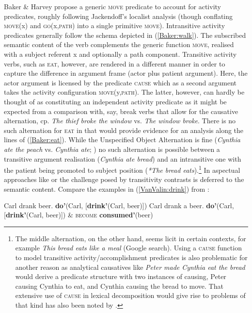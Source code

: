 Baker \& Harvey propose a generic \textsc{move} predicate to account for activity predicates, roughly following Jackendoff's  localist analysis (though conflating \textsc{move}(x) and \textsc{go}(x,\textsc{path}) into a single primitive \textsc{move}). Intransitive activity predicates generally follow the schema depicted in (\ref{Baker:walk}). The subscribed semantic content of the verb complements the generic function \textsc{move}, realised with a subject referent x and optionally a path component. Transitive activity verbs, such as \textsc{eat}, however, are rendered in a different manner in order to capture the difference in argument frame (actor plus patient argument). Here, the actor argument is licensed by the predicate \textsc{cause} which as a second argument takes the activity configuration \textsc{move}(y,\textsc{path}). The latter, however, can hardly be thought of as constituting an independent activity predicate as it might be expected from a comparison with, say, break verbs that allow for the causative alternation, cp. \textit{The thief broke the window} vs. \textit{The window broke}. There is no such alternation for \textsc{eat} in  that would provide evidence for an analysis along the lines of (\ref{Baker:eat}). While the Unspecified Object Alternation is fine (\textit{Cynthia ate the peach} vs. \textit{Cynthia ate}; \citealt[213]{Levin1993}) no such alternation is possible between a transitive argument realisation (\textit{Cynthia ate bread}) and an intransitive one with the patient being promoted to subject position (\textit{*The bread eats}).\footnote{The middle alternation, on the other hand, seems licit in certain contexts, for example \textit{This bread eats like a meal} (Google search). Using a \textsc{cause} function to model transitive activity/accomplishment predicates is also problematic for another reason as analytical causatives like \textit{Peter made Cynthia eat the bread} would derive a predicate structure with two instances of causing, Peter causing Cynthia to eat, and Cynthia causing the bread to move. That extensive use of \textsc{cause} in lexical decomposition would give rise to problems of that kind has also been noted by \citet{Jackendoff1990}.} In aspectual approaches like \citet{rappaport1998building} or \citet{van1997syntax} the challenge posed by transitivity contrasts is deferred to the semantic content. Compare the examples in (\ref{VanValin:drink}) from \citet[111]{van1997syntax}:

\ea \label{VanValin:drink}
\ea Carl drank beer. \label{VanValin:drinka}
 \textbf{do'}(Carl, [\textbf{drink'}(Carl, beer)])
\ex Carl drank a beer. \label{VanValin:drinkb}
 \textbf{do'}(Carl, [\textbf{drink'}(Carl, beer)]) \& \textsc{become} \textbf{consumed'}(beer)
\z
\z

